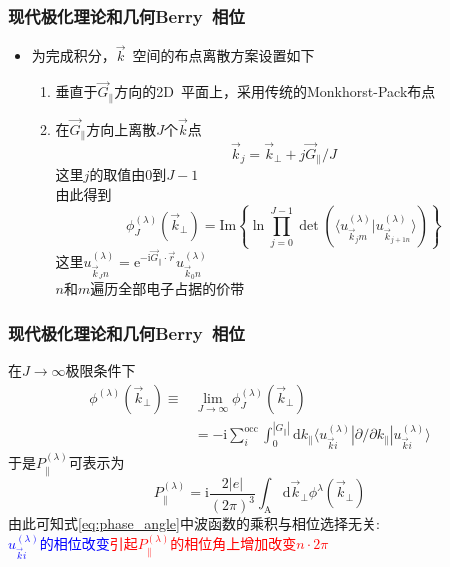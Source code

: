 \frame
{
	\frametitle{现代极化理论和几何\textrm{Berry~}相位}
	\begin{itemize}
		\item 为完成积分，$\vec k$~空间的布点离散方案设置如下
			\begin{enumerate}
				\item 垂直于$\vec G_{\lVert}$方向的2\textrm{D~}平面上，采用传统的\textrm{Monkhorst-Pack}布点
				\item 在$\vec G_{\lVert}$方向上离散$J$个$\vec k$点
\begin{displaymath}
	\vec k_j=\vec k_{\bot}+j\vec G_{\lVert}/J
\end{displaymath}
这里$j$的取值由0到$J-1$\\
由此得到
\begin{equation}
	\phi_J^{(\lambda)}(\vec k_{\bot})=\mathrm{Im}\left\{ \ln\prod_{j=0}^{J-1}\det(\langle u_{\vec k_j m}^{(\lambda)}|u_{\vec k_{j+1 n}}^{(\lambda)}\rangle) \right\}
	\label{eq:phase_angle}
\end{equation}
这里$u_{\vec k_J n}^{(\lambda)}=\mathrm{e}^{-\mathrm{i}\vec G_{\lVert}\cdot\vec r}u_{\vec k_0 n}^{(\lambda)}$\\
$n$和$m$遍历全部电子占据的价带
			\end{enumerate}
	\end{itemize}
}

\frame
{
	\frametitle{现代极化理论和几何\textrm{Berry~}相位}
	在$J\rightarrow\infty$极限条件下
	\begin{displaymath}
		\begin{aligned}
			\phi^{(\lambda)}(\vec k_{\bot})\equiv&\lim_{J\rightarrow\infty}\phi_J^{(\lambda)}(\vec k_{\bot})\\
			&=-\mathrm{i}\sum_{i}^{\mathrm{occ}}\int_0^{|G_{\lVert}|}\mathrm{d}k_{\lVert}\langle u_{\vec k i}^{(\lambda)}|\partial/\partial k_{\lVert}|u_{\vec k i}^{(\lambda)}\rangle
		\end{aligned}
	\end{displaymath}
	于是$P_{\lVert}^{(\lambda)}$可表示为
	\begin{displaymath}
		P_{\lVert}^{(\lambda)}=\mathrm{i}\frac{2|e|}{(2\pi)^3}\int_{\mathrm A}\mathrm{d}\vec k_{\bot}\phi^{\lambda}(\vec k_{\bot})
	\end{displaymath}
	由此可知式\eqref{eq:phase_angle}中波函数的乘积与相位选择无关:\\
	\textcolor{blue}{$u_{\vec k i}^{(\lambda)}$的相位改变}\textcolor{red}{引起$P_{\lVert}^{(\lambda)}$的相位角上增加改变$n\cdot2\pi$}
}

